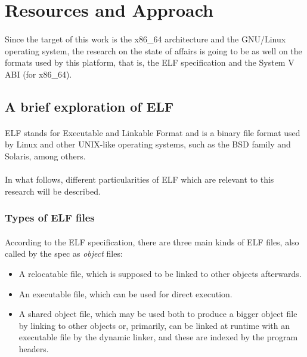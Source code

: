 \documentclass[12pt]{article}
\begin{document}
	\section{Resources and Approach}
	
	\paragraph{}Since the target of this work is the x86\_64 architecture and the GNU/Linux operating system, the research on the state of affairs is going to be as well on the formats used by this platform, that is, the ELF specification and the System V ABI (for x86\_64).

	\subsection{A brief exploration of ELF}
	
	\paragraph{}ELF stands for Executable and Linkable Format and is a binary file format used by Linux and other UNIX-like operating systems, such as the BSD family and Solaris, among others.
	\paragraph{}In what follows, different particularities of ELF which are relevant to this research will be described.
	
	\subsubsection{Types of ELF files}
	
	\paragraph{}According to the ELF specification\cite{elf-spec}, there are three main kinds of ELF files, also called by the spec as \textit{object} files:
	\begin{itemize}
		\item A relocatable file, which is supposed to be linked to other objects afterwards.
		\item An executable file, which can be used for direct execution.
		\item A shared object file, which may be used both to produce a bigger object file by linking to other objects or, primarily, can be linked at runtime with an executable file by the dynamic linker, and these are indexed by the program headers.
	\end{itemize}
\end{document}
